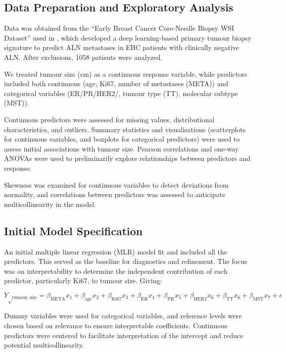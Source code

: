 \documentclass[letter]{article}
\begin{document}
\newpage

\subsection{Data Preparation and Exploratory Analysis}

Data was obtained from the “Early Breast Cancer Core-Needle Biopsy WSI Dataset” \cite{Zhu2021} used in \cite{Xu2021}, which developed a deep learning-based primary tumour biopsy 
signature to predict ALN metastases in EBC patients with clinically negative ALN. After exclusions, 1058 patients were analyzed.

We treated tumour size (cm) as a continuous response variable, while predictors included both continuous (age, Ki67, number of metastases (META))
and categorical variables (ER/PR/HER2/, tumour type (TT), molecular subtype (MST)).

Continuous predictors were assessed for missing values, distributional characteristics, and outliers. Summary statistics and visualisations 
(scatterplots for continuous variables, and boxplots for categorical predictors) were used to assess initial associations with tumour size.
Pearson correlations and one-way ANOVAs were used to preliminarily explore relationships between predictors and response. 

Skewness was examined for continuous variables to detect deviations from normality, and correlations between predictors was assessed to anticipate multicollinearity in the model.

\subsection{Initial Model Specification}

An initial multiple linear regression (MLR) model fit and included all the predictors. This served as the baseline for diagnostics  and refinement.
The focus was on interpretability to determine the independent contribution of each predictor, particularly Ki67, to tumour size. Giving:

\[Y_{\sqrt\text{tumour size}} = \beta_{\text{META}}x_1 + \beta_{\text{age}}x_2 + \beta_{\text{Ki67}}x_3 + \beta_{\text{ER}}x_4 + \beta_{\text{PR}}x_5 + \beta_{\text{HER2}}x_6 
+ \beta_{\text{TT}}x_6 + \beta_{\text{MST}}x_7 + \epsilon \]

Dummy variables were used for categorical variables, and reference levels were chosen based on relevance to ensure interpretable coefficients. 
Continuous predictors were centered to facilitate interpretation of the intercept and reduce potential multicollinearity.
\end{document}
